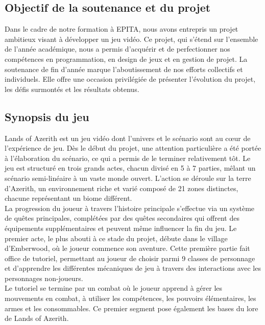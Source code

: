 
\subsection{Objectif de la soutenance et du projet}

Dans le cadre de notre formation à EPITA, nous avons entrepris un projet ambitieux visant à développer un jeu vidéo.
Ce projet, qui s'étend sur l'ensemble de l'année académique, nous a permis d'acquérir et de perfectionner nos compétences en programmation, en design de jeux et en gestion de projet.
La soutenance de fin d'année marque l'aboutissement de nos efforts collectifs et individuels.
Elle offre une occasion privilégiée de présenter l'évolution du projet, les défis surmontés et les résultats obtenus.

\subsection{Synopsis du jeu}

Lands of Azerith est un jeu vidéo dont l'univers et le scénario sont au cœur de l'expérience de jeu. 
Dès le début du projet, une attention particulière a été portée à l'élaboration du scénario, ce qui a permis de le terminer relativement tôt. 
Le jeu est structuré en trois grands actes, chacun divisé en 5 à 7 parties, mêlant un scénario semi-linéaire à un vaste monde ouvert. 
L'action se déroule sur la terre d'Azerith, un environnement riche et varié composé de 21 zones distinctes, chacune représentant un biome différent.
\\

La progression du joueur à travers l'histoire principale s'effectue via un système de quêtes principales, complétées par des quêtes secondaires qui offrent des équipements supplémentaires et peuvent même influencer la fin du jeu. 
Le premier acte, le plus abouti à ce stade du projet, débute dans le village d'Emberwood, où le joueur commence son aventure. 
Cette première partie fait office de tutoriel, permettant au joueur de choisir parmi 9 classes de personnage et d'apprendre les différentes mécaniques de jeu à travers des interactions avec les personnages non-joueurs.
\\

Le tutoriel se termine par un combat où le joueur apprend à gérer les mouvements en combat, à utiliser les compétences, les pouvoirs élémentaires, les armes et les consommables. 
Ce premier segment pose également les bases du lore de Lands of Azerith.
\\

